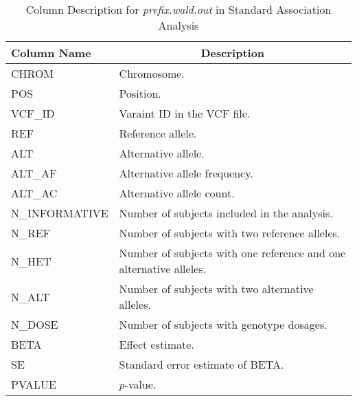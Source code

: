 \documentclass[12pt,letter]{article}
\begin{document}
{\centering
\begin{longtable}{p{4cm}p{11cm}}
\caption{Column Description for {\it prefix.wald.out} in Standard Association Analysis} \\
\hline\hline
\multicolumn{1}{l}{Column Name} & \multicolumn{1}{c}{Description} \\
\hline
{CHROM} & Chromosome. \\
{POS} & Position. \\
{VCF\_ID} & Varaint ID in the VCF file. \\
{REF} & Reference allele.\\
{ALT} & Alternative allele.\\
{ALT\_AF} & Alternative allele frequency.\\
{ALT\_AC} & Alternative allele count. \\
{N\_INFORMATIVE} & Number of subjects included in the analysis.\\
{N\_REF} & Number of subjects with two reference alleles.\\
{N\_HET} & Number of subjects with one reference and one alternative alleles.\\
{N\_ALT} & Number of subjects with two alternative alleles. \\
{N\_DOSE} & Number of subjects with genotype dosages. \\ 
{BETA} & Effect estimate. \\
{SE} & Standard error estimate of BETA. \\
{PVALUE} & $p$-value. \\
\hline
\end{longtable}}
\end{document}
